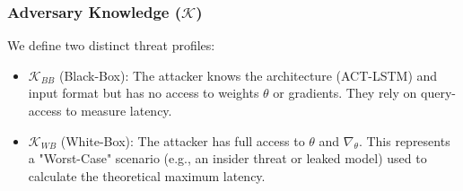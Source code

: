 \subsubsection{Adversary Knowledge ($\mathcal{K}$)}
We define two distinct threat profiles:
\begin{itemize}
    \item $\mathcal{K}_{BB}$ (Black-Box): The attacker knows the architecture (ACT-LSTM) and input format but has no access to weights $\theta$ or gradients. They rely on query-access to measure latency.
    \item $\mathcal{K}_{WB}$ (White-Box): The attacker has full access to $\theta$ and $\nabla_\theta$. This represents a "Worst-Case" scenario (e.g., an insider threat or leaked model) used to calculate the theoretical maximum latency.
\end{itemize}
